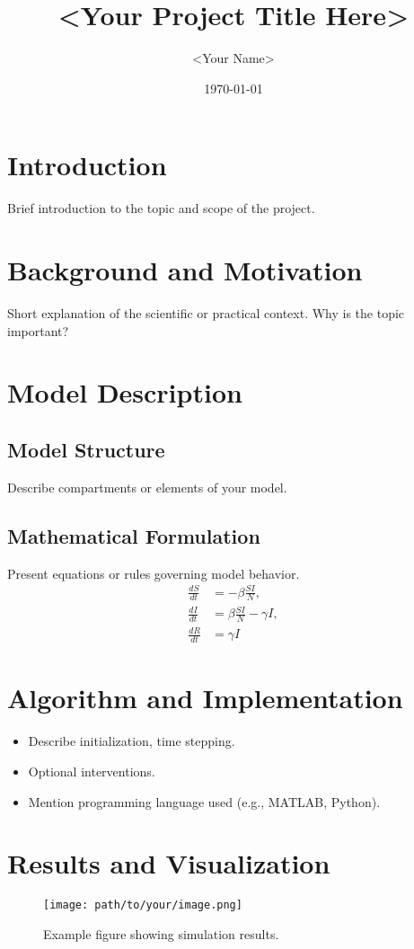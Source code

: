 \documentclass{article}
\title{<Your Project Title Here>}
\author{<Your Name>}
\date{\today}
\begin{document}
\maketitle

\section{Introduction}
Brief introduction to the topic and scope of the project.

\section{Background and Motivation}
Short explanation of the scientific or practical context. Why is the topic important?

\section{Model Description}
\subsection{Model Structure}
Describe compartments or elements of your model.

\subsection{Mathematical Formulation}
Present equations or rules governing model behavior.
\begin{align}
    \frac{dS}{dt} &= -\beta \frac{SI}{N}, \\
    \frac{dI}{dt} &= \beta \frac{SI}{N} - \gamma I, \\
    \frac{dR}{dt} &= \gamma I
\end{align}

\section{Algorithm and Implementation}
\begin{itemize}
    \item Describe initialization, time stepping.
    \item Optional interventions.
    \item Mention programming language used (e.g., MATLAB, Python).
\end{itemize}

\section{Results and Visualization}
\begin{figure}[htbp]
  \centering
  \texttt{[image: path/to/your/image.png]}
  \caption{Example figure showing simulation results.}
  \label{fig:results}
\end{figure}
\end{document}
